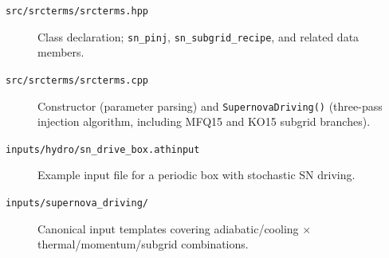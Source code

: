 \documentclass[11pt]{article}
\begin{document}
\begin{description}
  \item[\texttt{src/srcterms/srcterms.hpp}] Class declaration;
    \texttt{sn\_pinj}, \texttt{sn\_subgrid\_recipe}, and related data members.
  \item[\texttt{src/srcterms/srcterms.cpp}] Constructor (parameter parsing) and
    \texttt{SupernovaDriving()} (three-pass injection algorithm, including
    MFQ15 and KO15 subgrid branches).
  \item[\texttt{inputs/hydro/sn\_drive\_box.athinput}] Example input file for a
    periodic box with stochastic SN driving.
  \item[\texttt{inputs/supernova\_driving/}] Canonical input templates covering
    adiabatic/cooling $\times$ thermal/momentum/subgrid combinations.
\end{description}
\end{document}
